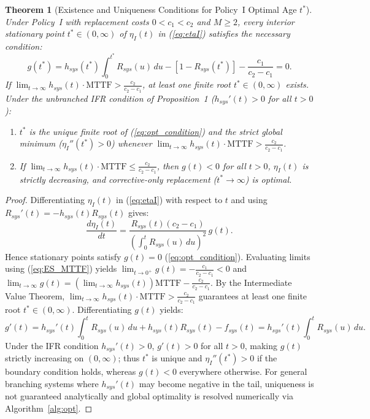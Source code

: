 \documentclass[10pt,a4paper]{article}
\newtheorem{theorem}{Theorem}
\begin{document}
\begin{theorem}[Existence and Uniqueness Conditions for Policy~I Optimal Age $t^*$]
Under Policy~I with replacement costs $0 < c_1 < c_2$ and $M \ge 2$, every interior stationary point $t^* \in (0, \infty)$ of $\eta_I(t)$ in (\ref{eq:etaI}) satisfies the necessary condition:
\begin{equation}
g(t^*) = h_{sys}(t^*) \int_{0}^{t^*} R_{sys}(u)\,du - [1 - R_{sys}(t^*)] - \frac{c_1}{c_2 - c_1} = 0.
\label{eq:opt_condition}
\end{equation}
If $\lim_{t \to \infty} h_{sys}(t) \cdot \mathrm{MTTF} > \frac{c_2}{c_2 - c_1}$, at least one finite root $t^* \in (0, \infty)$ exists. Under the unbranched IFR condition of Proposition~1 ($h_{sys}'(t) > 0$ for all $t > 0$):
\begin{enumerate}
    \item $t^*$ is the unique finite root of (\ref{eq:opt_condition}) and the strict global minimum ($\eta_I''(t^*) > 0$) whenever $\lim_{t \to \infty} h_{sys}(t) \cdot \mathrm{MTTF} > \frac{c_2}{c_2 - c_1}$.
    \item If $\lim_{t \to \infty} h_{sys}(t) \cdot \mathrm{MTTF} \le \frac{c_2}{c_2 - c_1}$, then $g(t) < 0$ for all $t > 0$, $\eta_I(t)$ is strictly decreasing, and corrective-only replacement ($t^* \to \infty$) is optimal.
\end{enumerate}
\end{theorem}

\begin{proof}
Differentiating $\eta_I(t)$ in (\ref{eq:etaI}) with respect to $t$ and using $R_{sys}'(t) = -h_{sys}(t) R_{sys}(t)$ gives:
$$\frac{d \eta_I(t)}{dt} = \frac{R_{sys}(t)(c_2 - c_1)}{\left(\int_{0}^{t} R_{sys}(u)\,du\right)^2} \, g(t).$$
Hence stationary points satisfy $g(t) = 0$ (\ref{eq:opt_condition}). Evaluating limits using (\ref{eq:ES_MTTF}) yields $\lim_{t \to 0^+} g(t) = -\frac{c_1}{c_2 - c_1} < 0$ and $\lim_{t \to \infty} g(t) = \left(\lim_{t \to \infty} h_{sys}(t)\right) \mathrm{MTTF} - \frac{c_2}{c_2 - c_1}$. By the Intermediate Value Theorem, $\lim_{t \to \infty} h_{sys}(t) \cdot \mathrm{MTTF} > \frac{c_2}{c_2 - c_1}$ guarantees at least one finite root $t^* \in (0, \infty)$. Differentiating $g(t)$ yields:
$$g'(t) = h_{sys}'(t) \int_{0}^{t} R_{sys}(u)\,du + h_{sys}(t) R_{sys}(t) - f_{sys}(t) = h_{sys}'(t) \int_{0}^{t} R_{sys}(u)\,du.$$
Under the IFR condition $h_{sys}'(t) > 0$, $g'(t) > 0$ for all $t > 0$, making $g(t)$ strictly increasing on $(0, \infty)$; thus $t^*$ is unique and $\eta_I''(t^*) > 0$ if the boundary condition holds, whereas $g(t) < 0$ everywhere otherwise. For general branching systems where $h_{sys}'(t)$ may become negative in the tail, uniqueness is not guaranteed analytically and global optimality is resolved numerically via Algorithm~\ref{alg:opt}.
\end{proof}
\end{document}
